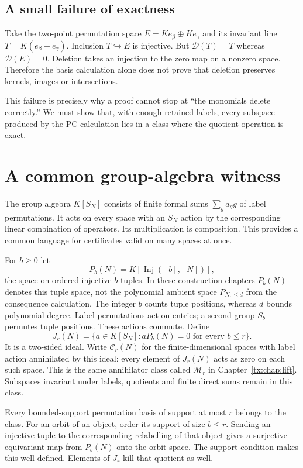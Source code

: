 \documentclass[11pt,a4paper,oneside,openany]{book}
\theoremstyle{definition}\newtheorem{definition}[theorem]{Definition}
\theoremstyle{remark}\newtheorem{remark}[theorem]{Remark}
\newcommand{\D}{\mathcal D}\newcommand{\Del}{\mathcal D}\newcommand{\Lift}{\mathsf L}
\DeclareMathOperator{\Inj}{Inj}
\numberwithin{equation}{chapter}
\begin{document}
\subsection{A small failure of exactness}
Take the two-point permutation space $E=Ke_\beta\oplus Ke_\gamma$ and its invariant line $T=K(e_\beta+e_\gamma)$. Inclusion $T\hookrightarrow E$ is injective. But $\D(T)=T$ whereas $\D(E)=0$. Deletion takes an injection to the zero map on a nonzero space. Therefore the basis calculation alone does not prove that deletion preserves kernels, images or intersections.

This failure is precisely why a proof cannot stop at ``the monomials delete correctly.'' We must show that, with enough retained labels, every subspace produced by the PC calculation lies in a class where the quotient operation is exact.

\section{A common group-algebra witness}\label{tx:sec:common}
The group algebra $K[S_N]$ consists of finite formal sums $\sum_ga_gg$ of label permutations. It acts on every space with an $S_N$ action by the corresponding linear combination of operators. Its multiplication is composition. This provides a common language for certificates valid on many spaces at once.

For $b\ge0$ let
\[P_b(N)=K[\Inj([b],[N])],\]
the space on ordered injective $b$-tuples. In these construction chapters $P_b(N)$ denotes this tuple space, not the polynomial ambient space $P_{N,\le d}$ from the consequence calculation. The integer $b$ counts tuple positions, whereas $d$ bounds polynomial degree. Label permutations act on entries; a second group $S_b$ permutes tuple positions. These actions commute. Define
\[J_r(N)=\{a\in K[S_N]:aP_b(N)=0\text{ for every }b\le r\}.\]
It is a two-sided ideal. Write $\mathcal C_r(N)$ for the finite-dimensional spaces with label action annihilated by this ideal: every element of $J_r(N)$ acts as zero on each such space. This is the same annihilator class called $\mathcal M_r$ in Chapter~\ref{tx:chap:lift}. Subspaces invariant under labels, quotients and finite direct sums remain in this class.

Every bounded-support permutation basis of support at most $r$ belongs to the class. For an orbit of an object, order its support of size $b\le r$. Sending an injective tuple to the corresponding relabelling of that object gives a surjective equivariant map from $P_b(N)$ onto the orbit space. The support condition makes this well defined. Elements of $J_r$ kill that quotient as well.
\end{document}
